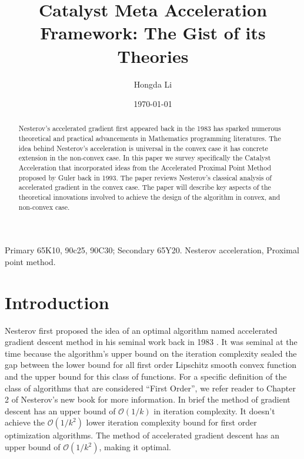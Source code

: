 \documentclass[12pt]{article}
\begin{document}
\title{
    {
        \selectfont 
        Catalyst Meta Acceleration Framework: The Gist of its Theories
    }
    }

\author{
    Hongda Li
}

\date{\today}

\maketitle


\begin{abstract} 
    \noindent
    Nesterov's accelerated gradient first appeared back in the 1983 has sparked numerous theoretical and practical advancements in Mathematics programming literatures. 
    The idea behind Nesterov's acceleration is universal in the convex case it has concrete extension in the non-convex case. 
    In this paper we survey specifically the Catalyst Acceleration that incorporated ideas from the Accelerated Proximal Point Method proposed by Guler back in 1993. 
    The paper reviews Nesterov's classical analysis of accelerated gradient in the convex case.
    The paper will describe key aspects of the theoretical innovations involved to achieve the design of the algorithm in convex, and non-convex case. 
    
\end{abstract}

Primary 65K10, 90c25, 90C30; Secondary 65Y20. 
 Nesterov acceleration, Proximal point method. 

\section{Introduction}
    Nesterov first proposed the idea of an optimal algorithm named accelerated gradient descent method in his seminal work back in 1983 \cite{nesterov_method_1983}. 
    It was seminal at the time because the algorithm's upper bound on the iteration complexity sealed the gap between the lower bound for all first order Lipschitz smooth convex function and the upper bound for this class of functions. 
    For a specific definition of the class of algorithms that are considered ``First Order'', we refer reader to Chapter 2 of Nesterov's new book \cite{nesterov_lectures_2018} for more information. 
    In brief the method of gradient descent has an upper bound of $\mathcal O(1/k)$ in iteration complexity. 
    It doesn't achieve the $\mathcal O(1/k^2)$ lower iteration complexity bound for first order optimization algorithms.
    The method of accelerated gradient descent has an upper bound of $\mathcal O(1/k^2)$, making it optimal. 
\end{document}
